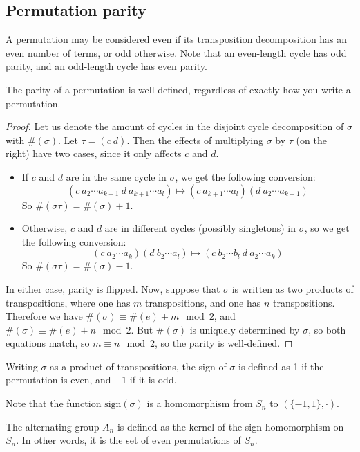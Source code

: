 \subsection{Permutation parity}
A permutation may be considered even if its transposition decomposition has an even number of terms, or odd otherwise.
Note that an even-length cycle has odd parity, and an odd-length cycle has even parity.
\begin{proposition}
	The parity of a permutation is well-defined, regardless of exactly how you write a permutation.
\end{proposition}
\begin{proof}
	Let us denote the amount of cycles in the disjoint cycle decomposition of \(\sigma\) with \(\#(\sigma)\).
	Let \(\tau = (c\ d)\).
	Then the effects of multiplying \(\sigma\) by \(\tau\) (on the right) have two cases, since it only affects \(c\) and \(d\).
	\begin{itemize}
		\item If \(c\) and \(d\) are in the same cycle in \(\sigma\), we get the following conversion:
		      \[
			      (c\ a_2 \cdots a_{k-1}\ d\ a_{k+1} \cdots a_l) \mapsto (c\ a_{k+1} \cdots a_l) (d\ a_2 \cdots a_{k-1})
		      \]
		      So \(\#(\sigma\tau) = \#(\sigma) + 1\).
		\item Otherwise, \(c\) and \(d\) are in different cycles (possibly singletons) in \(\sigma\), so we get the following conversion:
		      \[
			      (c\ a_2 \cdots a_k) (d\ b_2 \cdots a_l) \mapsto (c\ b_2 \cdots b_l\ d\ a_2 \cdots a_k)
		      \]
		      So \(\#(\sigma\tau) = \#(\sigma) - 1\).
	\end{itemize}
	In either case, parity is flipped.
	Now, suppose that \(\sigma\) is written as two products of transpositions, where one has \(m\) transpositions, and one has \(n\) transpositions.
	Therefore we have \(\#(\sigma) \equiv \#(e) + m \mod 2\), and \(\#(\sigma) \equiv \#(e) + n \mod 2\).
	But \(\#(\sigma)\) is uniquely determined by \(\sigma\), so both equations match, so \(m \equiv n \mod 2\), so the parity is well-defined.
\end{proof}

\begin{definition}
	Writing \(\sigma\) as a product of transpositions, the sign of \(\sigma\) is defined as 1 if the permutation is even, and \(-1\) if it is odd.
\end{definition}
Note that the function \(\mathrm{sign}(\sigma)\) is a homomorphism from \(S_n\) to \((\{-1, 1\}, \cdot)\).

\begin{definition}
	The alternating group \(A_n\) is defined as the kernel of the sign homomorphism on \(S_n\).
	In other words, it is the set of even permutations of \(S_n\).
\end{definition}
